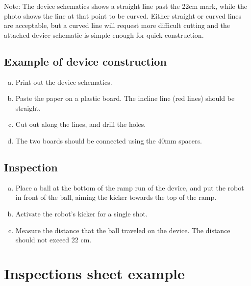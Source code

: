 \documentclass{article}
\begin{document}
Note: The device schematics shows a straight line past the 22cm mark, while the
photo shows the line at that point to be curved. Either straight or curved
lines are acceptable, but a curved line will request more difficult cutting and
the attached device schematic is simple enough for quick construction.

\subsection{Example of device construction}

\begin{enumerate}[a.]
    \item Print out the device schematics.
    \item Paste the paper on a plastic board. The incline line (red lines) should be straight.
    \item Cut out along the lines, and drill the holes.
    \item The two boards should be connected using the 40mm spacers.
\end{enumerate}

\subsection{Inspection}

\begin{enumerate}[a.]
    \item Place a ball at the bottom of the ramp run of the
        device, and put the robot in front of the ball, aiming the kicker
        towards the top of the ramp.

    \item Activate the robot's kicker for a single shot.

    \item Measure the distance that the ball traveled on the device. The
        distance should not exceed 22 cm.

\end{enumerate}


\section{Inspections sheet example\label{ref-065}}
\end{document}
